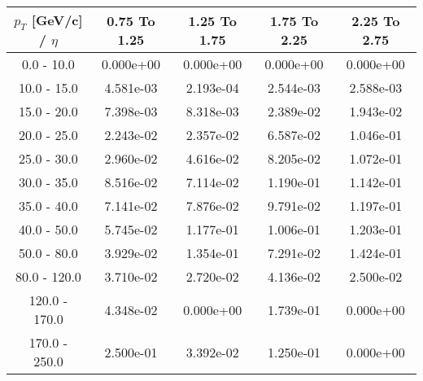 \begin{tabular}{|c|c|c|c|c|}\hline 
$p_T$ [GeV/c] / $\eta$  & 0.75 To 1.25 & 1.25 To 1.75 & 1.75 To 2.25 & 2.25 To 2.75 \\ 
 \hline 
0.0 - 10.0 & 0.000e+00 & 0.000e+00 & 0.000e+00 & 0.000e+00 \\ 
10.0 - 15.0 & 4.581e-03 & 2.193e-04 & 2.544e-03 & 2.588e-03 \\ 
15.0 - 20.0 & 7.398e-03 & 8.318e-03 & 2.389e-02 & 1.943e-02 \\ 
20.0 - 25.0 & 2.243e-02 & 2.357e-02 & 6.587e-02 & 1.046e-01 \\ 
25.0 - 30.0 & 2.960e-02 & 4.616e-02 & 8.205e-02 & 1.072e-01 \\ 
30.0 - 35.0 & 8.516e-02 & 7.114e-02 & 1.190e-01 & 1.142e-01 \\ 
35.0 - 40.0 & 7.141e-02 & 7.876e-02 & 9.791e-02 & 1.197e-01 \\ 
40.0 - 50.0 & 5.745e-02 & 1.177e-01 & 1.006e-01 & 1.203e-01 \\ 
50.0 - 80.0 & 3.929e-02 & 1.354e-01 & 7.291e-02 & 1.424e-01 \\ 
80.0 - 120.0 & 3.710e-02 & 2.720e-02 & 4.136e-02 & 2.500e-02 \\ 
120.0 - 170.0 & 4.348e-02 & 0.000e+00 & 1.739e-01 & 0.000e+00 \\ 
170.0 - 250.0 & 2.500e-01 & 3.392e-02 & 1.250e-01 & 0.000e+00 \\ 
 \hline 
\end{tabular} 
